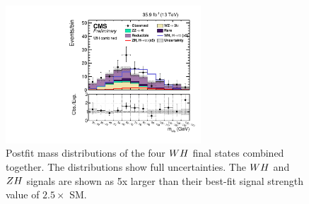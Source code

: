\begin{figure}[h!]
 \begin{center}
  \includegraphics[width=0.65\textwidth]{higgs_to_taus_vh/plots/wh/wh_postfit.pdf}
 \end{center}
 \caption{Postfit mass distributions of the four $WH$ final states
 combined together. 
 The distributions show full uncertainties.
 The $WH$ and $ZH$ signals are shown as 5x larger than their best-fit
 signal strength value of $2.5 \times$ SM.
 }
 \label{fig:mass_wh}
\end{figure}


